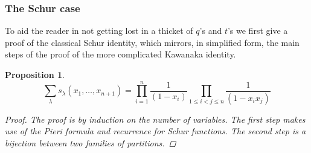 \documentclass[12pt,dvips]{amsart}
\newtheorem{proposition}{Proposition}[section]
\begin{document}
\subsubsection{The Schur case}
To aid the reader in not getting lost in a thicket of $q$'s and $t$'s we first give a proof of the classical Schur identity, which mirrors, in simplified form, the main steps of the proof of the more complicated Kawanaka identity. 
\begin{proposition} \label{schur}
$$ \sum_\lambda s_\lambda(x_1, \ldots, x_{n+1})= \prod_{i=1}^{n} \frac{1}{(1-x_i)} \prod_{1 \leq i<j \leq n} \frac{1}{(1-x_i x_j)} $$
\begin{proof}
The proof is by induction on the number of variables. The first step makes use of the Pieri formula and recurrence for Schur functions. The second step is a bijection between two families of partitions. %


\end{proof}
\end{proposition}
\end{document}
